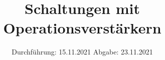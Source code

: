 
\setlength\parindent{0pt}
\subject{V51}
\title{Schaltungen mit Operationsverstärkern}
\date{%
  Durchführung: 15.11.2021
  \hspace{3em}
  Abgabe: 23.11.2021 \\
}



\maketitle
\thispagestyle{empty}
\tableofcontents
\newpage







\newpage
\nocite{*}
\printbibliography
\appendix


